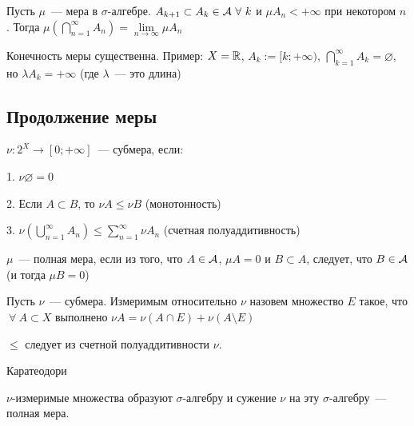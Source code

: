    \begin{consequence}
       Пусть $\mu$~--- мера в $\sigma$-алгебре. $A_{k + 1} \subset A_k \in \A \ \forall \ k$ и 
       $\mu A_n < +\infty$ при некотором $n$. 
       Тогда $\mu \left ( \bigcap \limits_{n = 1}^{\infty} A_n \right ) = \lim \limits_{n \to \infty} \mu A_n$
   \end{consequence}
   
   \begin{observation}
       Конечность меры существенна. Пример: $X = \mathbb{R}$, $A_k := [k; +\infty)$, $\bigcap \limits_{k = 1}^{\infty} A_k = \varnothing$, но
       $\lambda A_k = +\infty$ (где $\lambda$~--- это длина)
   \end{observation}


\subsection{Продолжение меры}

\begin{definition}
    $\nu : 2^X \to [0; +\infty]$~--- субмера, если:

    1. $\nu \varnothing = 0$

    2. Если $A \subset B$, то $\nu A \le \nu B$ (монотонность)

    3. $\nu \left ( \bigcup \limits_{n = 1}^{\infty} A_n \right ) \le \sum \limits_{n=1}^{\infty} \nu A_n$ (счетная полуаддитивность)
\end{definition}

\begin{definition}
    $\mu$~--- полная мера, если из того, что $A \in \mathcal{A}$, $\mu A = 0$ и $B \subset A$, следует, что $B \in \mathcal{A}$ (и тогда $\mu B = 0$)
\end{definition}

\begin{definition}
    Пусть $\nu$~--- субмера. Измеримым относительно $\nu$ назовем множество $E$ такое, что  $\ \forall \ A \subset X$ выполнено
    $\nu A = \nu (A \cap E) + \nu (A \setminus E)$
\end{definition}

\begin{observation}
    $\le $ следует из счетной полуаддитивности $\nu$.
\end{observation}

\begin{theorem} Каратеодори

    $\nu$-измеримые множества образуют $\sigma$-алгебру и сужение $\nu$ на эту $\sigma$-алгебру~--- полная мера.
\end{theorem}

